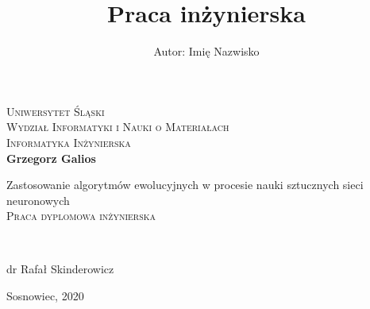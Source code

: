 
\newpage
\thispagestyle{empty}





\begin{onehalfspacing}
\begin{center}

\centering

\title{Praca inżynierska}
\author{Autor: Imię Nazwisko}


{\fontsize{17}{17}}\selectfont
\textsc{Uniwersytet Śląski \\[.3cm]
Wydział Informatyki i Nauki o Materiałach  \\[.3cm]
Informatyka Inżynierska  \\[2.5cm]}
\textbf{Grzegorz Galios \\[.3cm]}




\large 
{Zastosowanie algorytmów ewolucyjnych w procesie nauki sztucznych sieci neuronowych} \\[.5cm]
\textsc{Praca dyplomowa inżynierska}
\end{center} ~\\[3cm]

\large
\begin{flushright}
dr Rafał Skinderowicz \\
\end{flushright}

\begin{bottompar}
\begin{flushright}
Sosnowiec, 2020
\end{flushright}
\end{bottompar}
\end{onehalfspacing}






\setcounter{page}{0} \pagestyle{plain}

\pagestyle{fancy}
